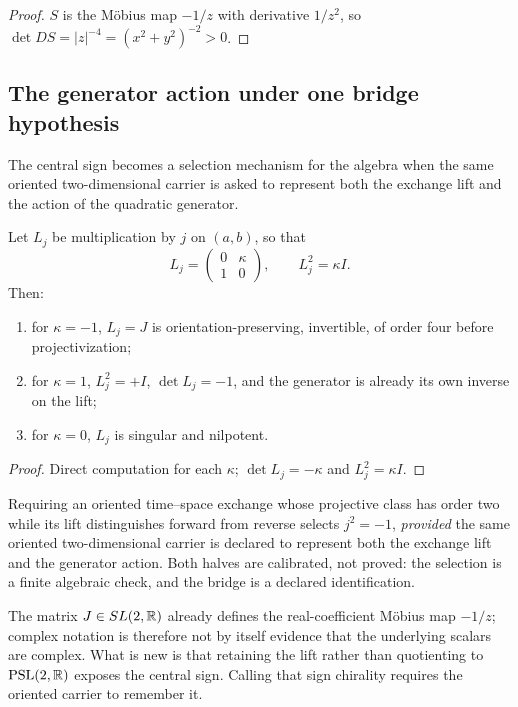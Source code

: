 \begin{proof}
$S$ is the M\"obius map $-1/z$ with derivative $1/z^{2}$, so
$\det DS=|z|^{-4}=(x^{2}+y^{2})^{-2}>0$.
\end{proof}

\subsection{The generator action under one bridge hypothesis}

The central sign becomes a selection mechanism for the algebra when the same oriented
two-dimensional carrier is asked to represent both the exchange lift and the action of
the quadratic generator.

\begin{proposition}\label{prop:generator-action}
Let $L_j$ be multiplication by $j$ on $(a,b)$, so that
\[
  L_j=\begin{pmatrix}0&\kappa\\ 1&0\end{pmatrix},\qquad L_j^{2}=\kappa I .
\]
Then:
\begin{enumerate}
\item for $\kappa=-1$, $L_j=J$ is orientation-preserving, invertible, of order four
  before projectivization;
\item for $\kappa=1$, $L_j^{2}=+I$, $\det L_j=-1$, and the generator is already its own
  inverse on the lift;
\item for $\kappa=0$, $L_j$ is singular and nilpotent.
\end{enumerate}
\end{proposition}

\begin{proof}
Direct computation for each $\kappa$; $\det L_j=-\kappa$ and $L_j^{2}=\kappa I$.
\end{proof}

\begin{calibration}\label{cal:bridge-hypothesis}
Requiring an oriented time--space exchange whose projective class has order two while
its lift distinguishes forward from reverse selects $j^{2}=-1$, \emph{provided} the
same oriented two-dimensional carrier is declared to represent both the exchange lift
and the generator action.  Both halves are calibrated, not proved: the selection is a
finite algebraic check, and the bridge is a declared identification.
\end{calibration}

\begin{warning}
The matrix $J\in SL(2,\mathbb{R})$ already defines the real-coefficient M\"obius map $-1/z$;
complex notation is therefore not by itself evidence that the underlying scalars are
complex.  What is new is that retaining the lift rather than quotienting to
$\operatorname{PSL}(2,\mathbb{R})$ exposes the central sign.  Calling that sign chirality requires the
oriented carrier to remember it.
\end{warning}

